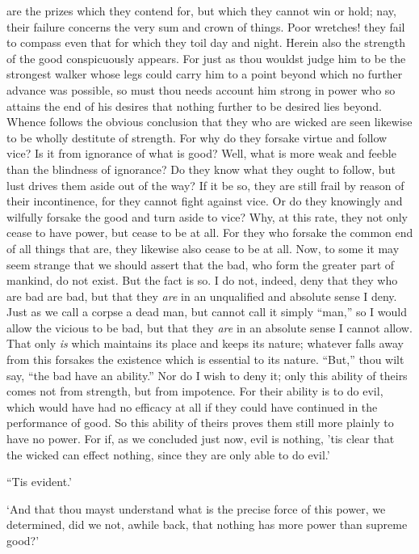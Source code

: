 \documentclass[12pt]{book}
\begin{document}
are the prizes which they contend for, but which they cannot
win or hold; nay, their failure concerns the very sum and crown of
things. Poor wretches! they fail to compass even that for which they
toil day and night. Herein also the strength of the good conspicuously
appears. For just as thou wouldst judge him to be the strongest walker
whose legs could carry him to a point beyond which no further advance
was possible, so must thou needs account him strong in power who so
attains the end of his desires that nothing further to be desired lies
beyond. Whence follows the obvious conclusion that they who are wicked
are seen likewise to be wholly destitute of strength. For why do they
forsake virtue and follow vice? Is it from ignorance of what is good?
Well, what is more weak and feeble than the blindness of ignorance? Do
they know what they ought to follow, but lust drives them aside out of
the way? If it be so, they are still frail by reason of their
incontinence, for they cannot fight against vice. Or do they knowingly
and wilfully forsake the good and turn aside to vice? Why, at this rate,
they not only cease to have power, but cease to be at all. For they who
forsake the common end of all things that are, they likewise also cease
to be at all. Now, to some it may seem strange that we should assert
that the bad, who form the greater part of mankind, do not exist. But
the fact is so. I do not, indeed, deny that they who are bad are bad,
but that they \emph{are} in an unqualified and absolute sense I deny. Just as
we call a corpse a dead man, but cannot call it simply ``man,'' so I would
allow the vicious to be bad, but that they \emph{are} in an absolute sense I
cannot allow. That only \emph{is} which maintains its place and keeps its
nature; whatever falls away from this forsakes the existence which is
essential to its nature. ``But,'' thou wilt say, ``the bad have an
ability.'' Nor do I wish to deny it; only this ability of theirs comes
not from strength, but from impotence. For their ability is to do evil,
which would have had no efficacy at all if they could have continued in
the performance of good. So this ability of theirs proves them still
more plainly to have no power. For if, as we concluded just now, evil is
nothing, 'tis clear that the wicked can effect nothing, since they are
only able to do evil.'

``Tis evident.'

`And that thou mayst understand what is the precise force of this power,
we determined, did we not, awhile back, that nothing has more power than
supreme good?'
\end{document}
